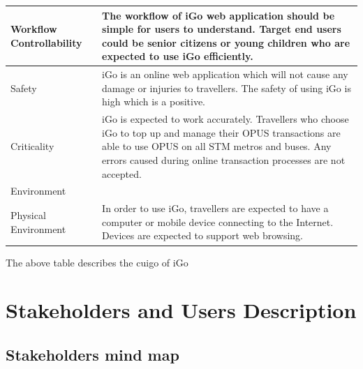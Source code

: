\documentclass[11pt, english]{article}
\begin{document}
\setlength{\tabcolsep}{18pt}
\renewcommand{\arraystretch}{1.5}
\begin{tabular}{ |p{3cm}|p{12cm}| }
\hline
Workflow Controllability & The workflow of iGo web application should be simple for users to understand. Target end users could be senior citizens or young children who are expected to use iGo efficiently.\\
\hline
Safety & 
iGo is an online web application which will not cause any damage or injuries to travellers. The safety of using iGo is high which is a positive.\\
\hline
Criticality & 
iGo is expected to work accurately. Travellers who choose iGo to top up and manage their OPUS transactions are able to use OPUS on all STM metros and buses. Any errors caused during online transaction processes are not accepted.\\
\hline
Environment & \\
\hline
Physical Environment & 
In order to use iGo, travellers are expected to have a computer or mobile device connecting to the Internet. Devices are expected to support web browsing.\\
\hline
\end{tabular}
\vspace*{0.3in}
The above table describes the \gls{cuigo} of iGo\\
\section{Stakeholders and Users Description}
\subsection{Stakeholders mind map}
\end{document}
